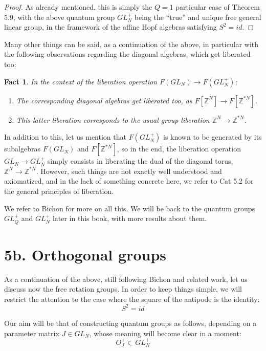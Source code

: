 \documentclass[12pt]{amsbook}
\newtheorem{fact}[theorem]{Fact}
\begin{document}
\begin{proof}
As already mentioned, this is simply the $Q=1$ particular case of Theorem 5.9, with the above quantum group $GL_N^+$ being the ``true'' and unique free general linear group, in the framework of the affine Hopf algebras satisfying $S^2=id$.
\end{proof}

Many other things can be said, as a continuation of the above, in particular with the following observations regarding the diagonal algebras, which get liberated too:

\begin{fact}
In the context of the liberation operation $F(GL_N)\to F(GL_N^+)$:
\begin{enumerate}
\item The corresponding diagonal algebras get liberated too, as $F[\mathbb Z^N]\to F[\mathbb Z^{*N}]$.

\item This latter liberation corresponds to the usual group liberation $\mathbb Z^N\to\mathbb Z^{*N}$.
\end{enumerate}
\end{fact} 

In addition to this, let us mention that $F(GL_N^+)$ is known to be generated by its subalgebras $F(GL_N)$ and $F[\mathbb Z^{*N}]$, so in the end, the liberation operation $GL_N\to GL_N^+$ simply consists in liberating the dual of the diagonal torus, $\mathbb Z^N\to\mathbb Z^{*N}$. However, such things are not exactly well understood and axiomatized, and in the lack of something concrete here, we refer to Cat 5.2 for the general principles of liberation.

\bigskip

We refer to Bichon \cite{bi3} for more on all this. We will be back to the quantum groups $GL_Q^+$ and $GL_N^+$ later in this book, with more results about them. 

\section*{5b. Orthogonal groups}

As a continuation of the above, still following Bichon \cite{bi3} and related work, let us discuss now the free rotation groups. In order to keep things simple, we will restrict the attention to the case where the square of the antipode is the identity:
$$S^2=id$$

Our aim will be that of constructing quantum groups as follows, depending on a parameter matrix $J\in GL_N$, whose meaning will become clear in a moment:
$$O_J^+\subset GL_N^+$$
\end{document}
